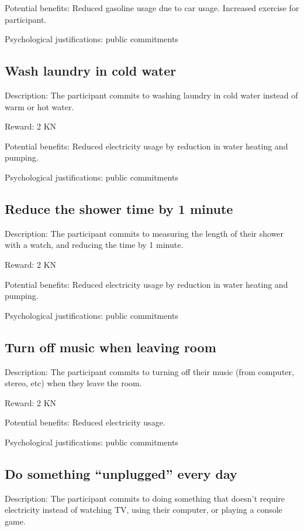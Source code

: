 Potential benefits: Reduced gasoline usage due to car usage. Increased exercise for participant.

Psychological justifications: public commitments

\subsection{Wash laundry in cold water}

Description: The participant commits to washing laundry in cold water instead of warm or hot water.

Reward: 2 KN

Potential benefits: Reduced electricity usage by reduction in water heating and pumping.

Psychological justifications: public commitments

\subsection{Reduce the shower time by 1 minute}

Description: The participant commits to measuring the length of their shower with a watch, and reducing the time by 1 minute.

Reward: 2 KN

Potential benefits: Reduced electricity usage by reduction in water heating and pumping.

Psychological justifications: public commitments

\subsection{Turn off music when leaving room}

Description: The participant commits to turning off their music (from computer, stereo, etc) when they leave the room.

Reward: 2 KN

Potential benefits: Reduced electricity usage.

Psychological justifications: public commitments

\subsection[Do something ``unplugged'' every day]{Do something ``unplugged'' every day}

Description: The participant commits to doing something that doesn't require electricity instead of watching TV, using their computer, or playing a console game.

